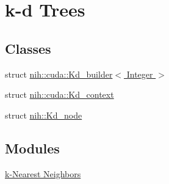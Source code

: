 \hypertarget{group__kdtree}{
\section{k-\/d \-Trees}
\label{group__kdtree}
}
\subsection*{\-Classes}
\begin{DoxyCompactItemize}
\item 
struct \hyperlink{structnih_1_1cuda_1_1_kd__builder}{nih\-::cuda\-::\-Kd\-\_\-builder$<$ Integer $>$}
\item 
struct \hyperlink{structnih_1_1cuda_1_1_kd__context}{nih\-::cuda\-::\-Kd\-\_\-context}
\item 
struct \hyperlink{structnih_1_1_kd__node}{nih\-::\-Kd\-\_\-node}
\end{DoxyCompactItemize}
\subsection*{\-Modules}
\begin{DoxyCompactItemize}
\item 
\hyperlink{group__knn}{k-\/\-Nearest Neighbors}
\end{DoxyCompactItemize}
